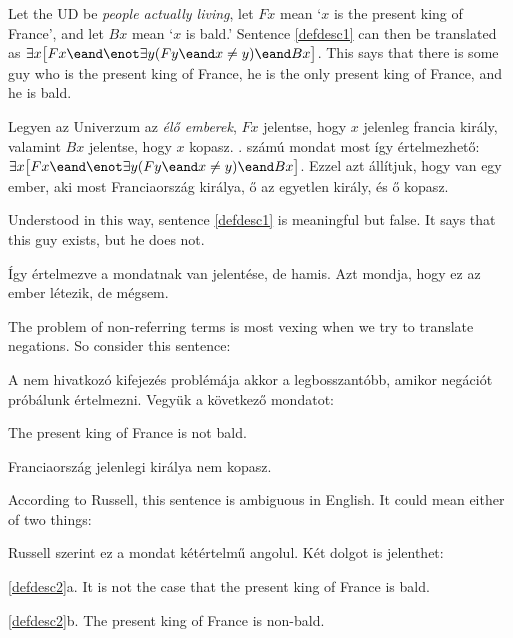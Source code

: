 Let the UD be \emph{people actually living}, let $Fx$ mean `$x$ is the present king of France', and let $Bx$ mean `$x$ is bald.' Sentence \ref{defdesc1} can then be translated as $\exists x\bigl[Fx \eand \enot\exists y(Fy \eand x\neq y) \eand Bx\bigr]$. This says that there is some guy who is the present king of France, he is the only present king of France, and he is bald.

Legyen az Univerzum az \emph{élő emberek}, $Fx$ jelentse, hogy $x$ jelenleg francia király, valamint $Bx$ jelentse, hogy $x$ kopasz. . számú mondat most így értelmezhető: $\exists x\bigl[Fx \eand \enot\exists y(Fy \eand x\neq y) \eand Bx\bigr]$. Ezzel azt állítjuk, hogy van egy ember, aki most Franciaország királya, ő az egyetlen király, és ő kopasz.

Understood in this way, sentence \ref{defdesc1} is meaningful but false. It says that this guy exists, but he does not.

Így értelmezve a mondatnak van jelentése, de hamis. Azt mondja, hogy ez az ember létezik, de mégsem.

The problem of non-referring terms is most vexing when we try to translate negations. So consider this sentence:

A nem hivatkozó kifejezés problémája akkor a legbosszantóbb, amikor negációt próbálunk értelmezni. Vegyük a következő mondatot:



\begin{earg}
\item[\ex{defdesc2}] The present king of France is not bald.
\end{earg}

\begin{earg}
\item[\ex{defdesc2}] Franciaország jelenlegi királya nem kopasz.
\end{earg}

According to Russell, this sentence is ambiguous in English. It could mean either of two things:

Russell szerint ez a mondat kétértelmű angolul. Két dolgot is jelenthet:

\begin{earg}
\item[\ref{defdesc2}a.] It is not the case that the present king of France is bald.
\item[\ref{defdesc2}b.] The present king of France is non-bald.
\end{earg}

